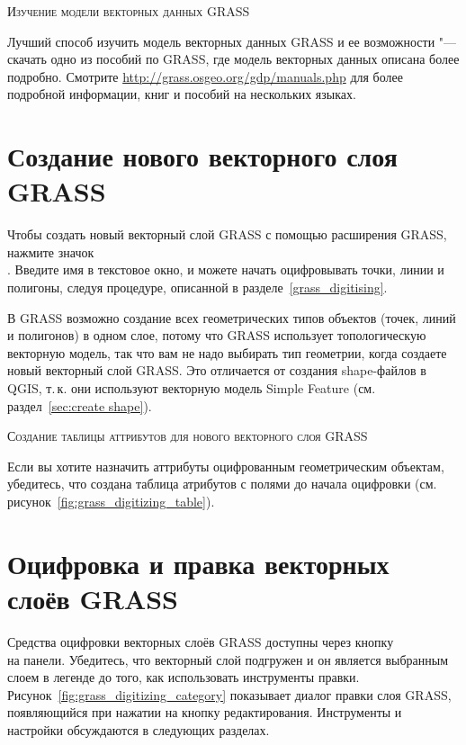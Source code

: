 \begin{Tip}\caption{\textsc{Изучение модели векторных данных GRASS}}
Лучший способ изучить модель векторных данных GRASS и ее возможности "---
скачать одно из пособий по GRASS, где модель векторных данных описана
более подробно. Смотрите \url{http://grass.osgeo.org/gdp/manuals.php}
для более подробной информации, книг и пособий на нескольких языках.
\end{Tip}

\section{Создание нового векторного слоя GRASS}\label{sec:creating_new_grass_vectors}

Чтобы создать новый векторный слой GRASS с помощью расширения GRASS,
нажмите значок \\
.
Введите имя в текстовое окно, и можете начать оцифровывать точки, линии
и полигоны, следуя процедуре, описанной в разделе~\ref{grass_digitising}.

В GRASS возможно создание всех геометрических типов объектов (точек,
линий и полигонов) в одном слое, потому что GRASS использует
топологическую векторную модель, так что вам не надо выбирать тип
геометрии, когда создаете новый векторный слой GRASS. Это отличается от
создания shape-файлов в QGIS, т.\,к. они используют векторную модель
Simple Feature (см. раздел~\ref{sec:create shape}).

\begin{Tip}\caption{\textsc{Создание таблицы аттрибутов для нового векторного слоя GRASS}}
Если вы хотите назначить аттрибуты оцифрованным геометрическим объектам,
убедитесь, что создана таблица атрибутов с полями до начала оцифровки
(см. рисунок~\ref{fig:grass_digitizing_table}).
\end{Tip}

\section{Оцифровка и правка векторных слоёв GRASS}\label{grass_digitising}

Средства оцифровки векторных слоёв GRASS доступны через кнопку \\
 на панели.
Убедитесь, что векторный слой подгружен и он является выбранным слоем в
легенде до того, как использовать инструменты правки.
Рисунок~\ref{fig:grass_digitizing_category} показывает диалог правки
слоя GRASS, появляющийся при нажатии на кнопку редактирования.
Инструменты и настройки обсуждаются в следующих разделах.

